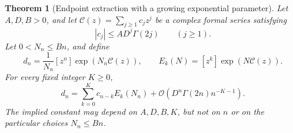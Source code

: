 \documentclass[11pt,a4paper]{article}
\newtheorem{theorem}{Theorem}[section]
\theoremstyle{definition}
\numberwithin{equation}{section}
\newcommand{\coef}[2]{[#1^{#2}]}
\newcommand{\Oh}{\mathcal O}
\newcommand{\cformal}{\mathscr C}
\begin{document}
\begin{theorem}[Endpoint extraction with a growing exponential parameter]
\label{thm:endpoint}
Let $A,D,B>0$, and let $\cformal(z)=\sum_{j\ge1}c_jz^j$ be a complex formal series satisfying
\begin{equation}
 |c_j|\le A D^j\Gamma(2j)\qquad(j\ge1).
 \label{eq:factorial-bound}
\end{equation}
Let $0<N_n\le Bn$, and define
\[
 d_n=\frac1{N_n}\coef{z}{n}\exp(N_n\cformal(z)),\qquad
 E_k(N)=\coef{z}{k}\exp(N\cformal(z)).
\]
For every fixed integer $K\ge0$,
\begin{equation}
 d_n=\sum_{k=0}^{K}c_{n-k}E_k(N_n)
       +\Oh\!\left(D^n\Gamma(2n)n^{-K-1}\right).
 \label{eq:endpoint-theorem}
\end{equation}
The implied constant may depend on $A,D,B,K$, but not on $n$ or on the particular choices $N_n\le Bn$.
\end{theorem}
\end{document}
